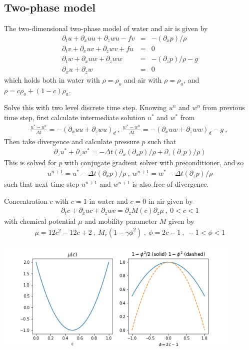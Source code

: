 \documentclass[12pt]{article}
\newcommand{\beq}  { \begin{eqnarray} }
\newcommand{\eeq}  { \end{eqnarray}}
\newcommand{\p}{{\partial}}
\begin{document}
 


  \subsection*{Two-phase model}

The two-dimensional two-phase model of water and air is given by
\beq
 \p_t u  + \p_x   u u  + \p_z w u - f v &=& - (\p_x p)  /\rho
 \\
 \p_t v  + \p_x   u v  + \p_z w v + f u &=& 0
 \\
  \p_t  w  +  \p_x   u w  + \p_z w w &=& - (\p_z p)/\rho   - g 
  \\
  \p_x u + \p_z w  &=&0
  \eeq
  which holds both in water with $\rho=\rho_o$ and air with $\rho=\rho_a$,
  and 
  $\rho = c \rho_o + (1-c) \rho_a$.  %
 
   Solve this with two level discrete time step. Knowing $u^n$ and $w^n$ from previous time step,
  first calculate intermediate solution  $u^*$ and $w^*$ from 
  \beq
    \frac{u^*-u^n}{\Delta t} = - (\p_x   u u  + \p_z w u)_d ~,~
      \frac{w^*-w^n}{\Delta t} = -(\p_x   u w  + \p_z w w )_d - g   ~,~
  \eeq
  Then take divergence and  calculate pressure $p$ such that
   \beq
    \p_z u^*  + \p_z w^* =  - \Delta t (  \p_x (\p_x p)  /\rho + \p_z  (\p_z p)/\rho  ) 
  \eeq
 This is solved for $p$  with conjugate gradient solver with preconditioner, and so
 \beq
  u^{n+1}  = u^* - \Delta t  (\p_x p)  /\rho ~,~w^{n+1} = w^* -  \Delta t  (\p_z p)  /\rho 
 \eeq
  such that next time step $u^{n+1}$ and $w^{n+1}$ is also free of divergence.
  
  Concentration $c$ with $c=1$ in water and $c=0$ in air given by 
  \beq
  \p_t c +  \p_x   u c  + \p_z w c  = \p_z  M(c) \p_z   \mu  ~,~ 0 < c < 1 
  \eeq
  with chemical potential $\mu$ and mobility parameter $M$ given by
  \beq
   \mu =  12 c^2 - 12c  + 2~,~M_c (1- \gamma \phi^2) ~,~  \phi = 2 c-1  ~,~-1 < \phi < 1 
\eeq
\centerline{ \includegraphics[width=0.9\textwidth]{mu1} }
\end{document}
